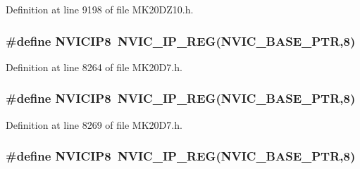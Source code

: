 Definition at line 9198 of file M\+K20\+D\+Z10.\+h.

\subsubsection[{\texorpdfstring{N\+V\+I\+C\+I\+P8}{NVICIP8}}]{\setlength{\rightskip}{0pt plus 5cm}\#define N\+V\+I\+C\+I\+P8~{\bf N\+V\+I\+C\+\_\+\+I\+P\+\_\+\+R\+EG}({\bf N\+V\+I\+C\+\_\+\+B\+A\+S\+E\+\_\+\+P\+TR},8)}\hypertarget{group___n_v_i_c___register___accessor___macros_ga9b6e9b03c131bc0464201992f9db74ba}{}\label{group___n_v_i_c___register___accessor___macros_ga9b6e9b03c131bc0464201992f9db74ba}


Definition at line 8264 of file M\+K20\+D7.\+h.

\subsubsection[{\texorpdfstring{N\+V\+I\+C\+I\+P8}{NVICIP8}}]{\setlength{\rightskip}{0pt plus 5cm}\#define N\+V\+I\+C\+I\+P8~{\bf N\+V\+I\+C\+\_\+\+I\+P\+\_\+\+R\+EG}({\bf N\+V\+I\+C\+\_\+\+B\+A\+S\+E\+\_\+\+P\+TR},8)}\hypertarget{group___n_v_i_c___register___accessor___macros_ga9b6e9b03c131bc0464201992f9db74ba}{}\label{group___n_v_i_c___register___accessor___macros_ga9b6e9b03c131bc0464201992f9db74ba}


Definition at line 8269 of file M\+K20\+D7.\+h.

\subsubsection[{\texorpdfstring{N\+V\+I\+C\+I\+P8}{NVICIP8}}]{\setlength{\rightskip}{0pt plus 5cm}\#define N\+V\+I\+C\+I\+P8~{\bf N\+V\+I\+C\+\_\+\+I\+P\+\_\+\+R\+EG}({\bf N\+V\+I\+C\+\_\+\+B\+A\+S\+E\+\_\+\+P\+TR},8)}\hypertarget{group___n_v_i_c___register___accessor___macros_ga9b6e9b03c131bc0464201992f9db74ba}{}\label{group___n_v_i_c___register___accessor___macros_ga9b6e9b03c131bc0464201992f9db74ba}


